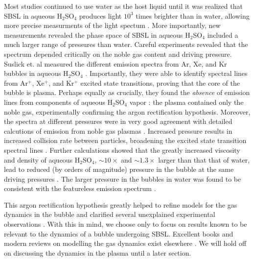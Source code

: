 \documentclass[rmp,aps,nofootinbib,superscriptaddress,floatfix]{revtex4-2}
\begin{document}
Most studies continued to use water as the host liquid until it was realized that SBSL in aqueous H$_2$SO$_4$ produces light $10^3$ times brighter than in water, allowing more precise measurments of the light spectum \cite{}. More importantly, new measurements revealed the phase space of SBSL in aqueous H$_2$SO$_4$ included a much larger range of pressures than water. Careful experiments revealed that the spectrum depended critically on the noble gas content and driving pressure. Suslick et. al measured the different emission spectra from Ar, Xe, and Kr bubbles in aqueous H$_2$SO$_4$ \cite{flannigan2005plasma,flannigan2006measurement,suslick2008inside}. Importantly, they were able to identify spectral lines from Ar$^+$, Xe$^+$, and Kr$^+$ excited state transitions, proving that the core of the bubble is plasma. Perhaps equally as crucially, they found the \emph{absence} of emission lines from components of aqueous H$_2$SO$_4$ vapor \cite{suslick2008inside,flannigan2006measurement,flannigan2006measurement}: the plasma contained only the noble gas, experimentally confirming the argon rectification hypothesis. Moreover, the spectra at different pressures were in very good agreement with detailed calcutions of emission from noble gas plasmas \cite{an2009diagnosing,an2008spectral}. Increased pressure results in increased collision rate between particles, broadening the excited state transition spectral lines \cite{an2008spectral,suslick2008inside,flannigan2005plasma,flannigan2006measurement}. Further calculations showed that the greatly increased viscosity and density of aqueous H$_2$SO$_4$, $\sim 10 \times$ and $\sim 1.3 \times$ larger than that that of water, lead to reduced (by orders of magnitude) pressure in the bubble at the same driving pressures \cite{an2009diagnosing}. The larger pressure in the bubbles in water was found to be consistent with the featureless emission spectrum \cite{suslick2008inside,yasui2018acoustic}. 

This argon rectification hypothesis greatly helped to refine models for the gas dynamics in the bubble and clarified several unexplained experimental observations \cite{suslick2008inside,brenner2002single}. With this in mind, we choose only to focus on results known to be relevant to the dynamics of a bubble undergoing SBSL. Excellent books and modern reviews on modelling the gas dynamics exist elsewhere \cite{brenner2002single,yasui2018acoustic,brennen2014cavitation}. We will hold off on discussing the dynamics in the plasma until a later section. 
\end{document}
